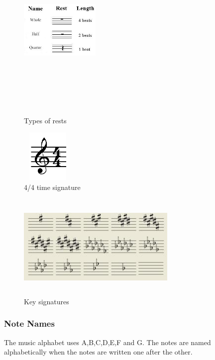 \documentclass[journal]{IEEEtran}
\begin{document}
\begin{figure}
\includegraphics[width=1.5in,height=3.5in,clip,keepaspectratio]{resources/images/rest}
\centering
\caption{Types of rests}
\end{figure}

\begin{figure}
\includegraphics[width=1.0in,height=1.0in,clip,keepaspectratio]{resources/images/time_signature_4_4}
\centering
\caption{4/4 time signature}
\end{figure}

\begin{figure}
\includegraphics[width=3.0in,height=2.0in,clip,keepaspectratio]{resources/images/key_signatures}
\centering
\caption{Key signatures}
\end{figure}

\subsubsection{Note Names}
The music alphabet uses A,B,C,D,E,F and G. The notes are named alphabetically when the notes are written one after the other.
\end{document}
